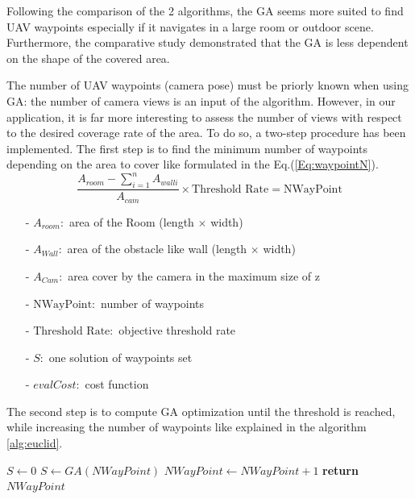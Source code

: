 \hfill 
\vfill
\newpage

Following the comparison of the 2 algorithms, the GA seems more suited to find UAV waypoints especially if it navigates in a large room or outdoor scene. Furthermore, the comparative study demonstrated that the GA is less dependent on the shape of the  covered area. 


The number of UAV waypoints (camera pose) must be priorly known when using GA: the number of camera views is an input of the algorithm. However, in our application, it is far more interesting to assess the number of views with respect to the desired coverage rate of the area. 
To do so, a two-step procedure has been implemented. 
The first step is to find the minimum number of waypoints depending on the area to cover like  formulated in the Eq.(\ref{Eq:waypointN}). \\
\begin{equation}\label{Eq:waypointN}
\frac{ A_{room} - \sum_{i=1}^n A_{wall i} }{A_{cam}} \times \mbox{Threshold Rate} = \mbox{NWayPoint}
\end{equation}

\begin{itemize}
\item[-] $ A_{room}: $  area of the Room (length $\times$ width)
\item[-] $ A_{Wall}: $  area of the obstacle like wall (length $\times$ width)
\item[-] $ A_{Cam}: $   area cover by the camera in the maximum size of z
\item[-] $ \mbox{NWayPoint}: $  number of waypoints
\item[-] $ \mbox{Threshold Rate}: $ objective threshold rate 
\item[-] $S:$ one solution of waypoints set 
\item[-] $evalCost:$ cost function  
\end{itemize}

The second step is to compute GA optimization until the threshold is reached, while increasing the number of waypoints like explained in the algorithm \ref{alg:euclid}.  

\begin{algorithm}
\caption{}\label{alg:euclid}
\begin{algorithmic}[1]
 \State $S\gets 0$
	 \State $S \gets GA(NWayPoint)$
	  \State $NWayPoint\gets NWayPoint+1$
  \EndWhile\label{endwhile}
\State \textbf{return} $NWayPoint$
\EndProcedure
\end{algorithmic}
\end{algorithm}